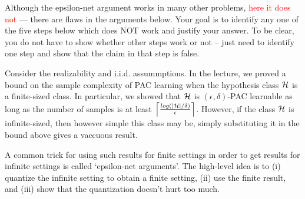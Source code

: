 Although the epsilon-net argument works in many other problems, \textcolor{red}{here it does not} --- there are flaws in the arguments below. Your goal is to identify any one of the five steps below which does NOT work and justify your answer.  To be clear, you do not have to show whether other steps work or not -- just need to identify one step and show that the claim in that step is false.
\vspace{5mm}

Consider the realizability and i.i.d. assummptions. In the lecture, we proved a bound on the sample complexity of PAC learning when the hypothesis class ${\cal H}$ is a finite-sized class. In particular, we showed that ${\cal H}$ is $(\epsilon,\delta)$-PAC learnable as long as the number of samples is at least $\left \lceil{\frac{log(|\cal H|/\delta)}{\epsilon}}\right \rceil $. However, if the class ${\cal H}$ is infinite-sized, then however simple this class may be, simply substituting it in the bound above gives a vaccuous result. 

A common trick for using such results for finite settings in order to get results for infinite settings is called `epsilon-net arguments'. The high-level idea is to (i) quantize the infinite setting to obtain a finite setting, (ii) use the finite result, and (iii) show that the quantization doesn't hurt too much. 

